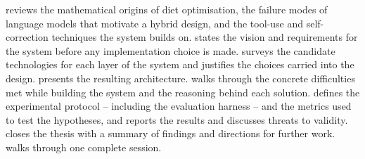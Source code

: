  reviews the mathematical origins of diet optimisation, the failure modes of language models that motivate a hybrid design, and the tool-use and self-correction techniques the system builds on.  states the vision and requirements for the system before any implementation choice is made.  surveys the candidate technologies for each layer of the system and justifies the choices carried into the design.  presents the resulting architecture.  walks through the concrete difficulties met while building the system and the reasoning behind each solution.  defines the experimental protocol -- including the evaluation harness -- and the metrics used to test the hypotheses, and  reports the results and discusses threats to validity.  closes the thesis with a summary of findings and directions for further work.  walks through one complete session.
